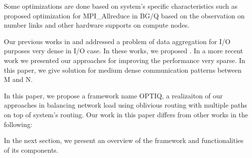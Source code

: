 Some optimizations are done based on system’s specific characteristics such as \cite{Kumar:Allreduce} proposed optimization for MPI\_Allreduce in BG/Q based on the observation on number links and other hardware supports on compute nodes.

Our previous works in \cite{Vishwanath:GLEAN} and \cite{SDAV:Bui2014b} addressed a problem of data aggregation for I/O purposes very dense in I/O case. In these works, we proposed . In a more recent work \cite{hbui:bgq} we presented our approaches for improving the performance very sparse. In this paper, we give solution for medium dense communication patterns between M and N.

In this paper, we propose a framework name OPTIQ, a realizaiton of our approaches in balancing network load using oblivious routing with multiple paths on top of system's routing. Our work in this paper differs from other works in the following:

In the next section, we present an overview of the framework and functionalities of its components.
